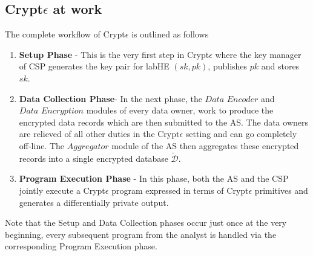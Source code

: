 \subsection{Crypt$\epsilon$ at work}
The complete workflow of Crypt$\epsilon$ is outlined as follows
\begin{enumerate}\item \textbf{\textsf{Setup Phase}} - This is the very first step in Crypt$\epsilon$ where the key manager of \textsf{CSP} generates the key pair for labHE $(sk,pk)$, publishes $pk$ and stores $sk$. \item \textbf{\textsf{Data Collection Phase}}- In the next phase, the $\textit{Data 
Encoder}$ and $\textit{Data Encryption}$ modules of every data owner, work to produce the encrypted data records which are then submitted to the \textsf{AS}. The data owners are relieved of all other duties in the Crypt$\epsilon$ setting and can go completely off-line. The $\textit{Aggregator}$ module of the \textsf{AS} then aggregates these encrypted records into a single encrypted database $\boldsymbol{\tilde{\mathcal{D}}}$. \item \textbf{\textsf{ Program Execution Phase}} - In this phase, both the \textsf{AS} and the \textsf{CSP} jointly execute a Crypt$\epsilon$ program expressed in terms of Crypt$\epsilon$ primitives and generates a differentially private output.  \end{enumerate}
Note that the \textsf{Setup} and \textsf{Data Collection} phases occur just once at the very beginning, every subsequent program from the analyst is handled via the corresponding  \textsf{Program Execution} phase.
